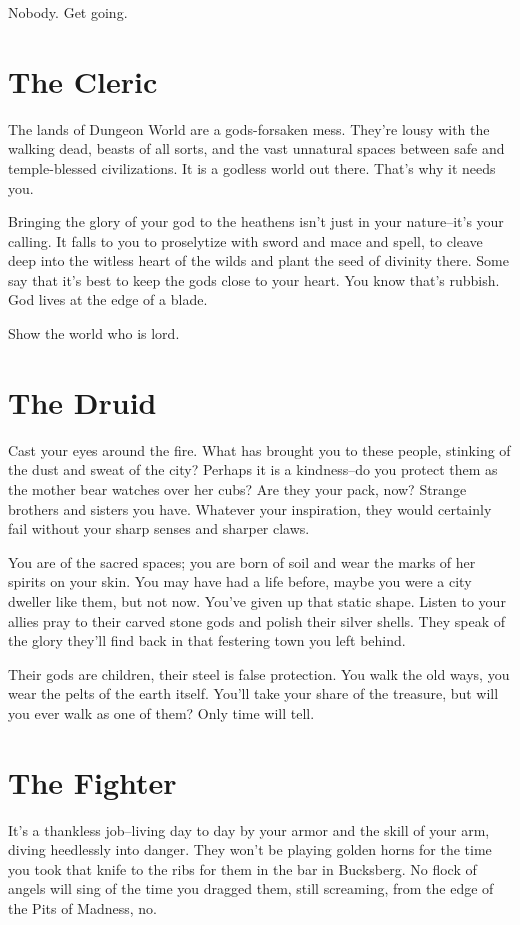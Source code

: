  Nobody. Get going.
\section{The Cleric}


 The lands of Dungeon World are a gods-forsaken mess. They're lousy with the walking dead, beasts of all sorts, and the vast unnatural spaces between safe and temple-blessed civilizations. It is a godless world out there. That's why it needs you.


 Bringing the glory of your god to the heathens isn't just in your nature--it's your calling. It falls to you to proselytize with sword and mace and spell, to cleave deep into the witless heart of the wilds and plant the seed of divinity there. Some say that it's best to keep the gods close to your heart. You know that's rubbish. God lives at the edge of a blade.


 Show the world who is lord.
\section{The Druid}


 Cast your eyes around the fire. What has brought you to these people, stinking of the dust and sweat of the city? Perhaps it is a kindness--do you protect them as the mother bear watches over her cubs? Are they your pack, now? Strange brothers and sisters you have. Whatever your inspiration, they would certainly fail without your sharp senses and sharper claws.


 You are of the sacred spaces; you are born of soil and wear the marks of her spirits on your skin. You may have had a life before, maybe you were a city dweller like them, but not now. You've given up that static shape. Listen to your allies pray to their carved stone gods and polish their silver shells. They speak of the glory they'll find back in that festering town you left behind.


 Their gods are children, their steel is false protection. You walk the old ways, you wear the pelts of the earth itself. You'll take your share of the treasure, but will you ever walk as one of them? Only time will tell.
\section{The Fighter}


 It's a thankless job--living day to day by your armor and the skill of your arm, diving heedlessly into danger. They won't be playing golden horns for the time you took that knife to the ribs for them in the bar in Bucksberg. No flock of angels will sing of the time you dragged them, still screaming, from the edge of the Pits of Madness, no.


